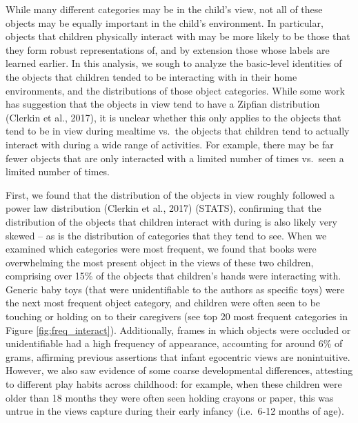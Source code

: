 \documentclass[10pt, letterpaper]{article}
\begin{document}
While many different categories may be in the child's view, not all of
these objects may be equally important in the child's environment. In
particular, objects that children physically interact with may be more
likely to be those that they form robust representations of, and by
extension those whose labels are learned earlier. In this analysis, we
sough to analyze the basic-level identities of the objects that children
tended to be interacting with in their home environments, and the
distributions of those object categories. While some work has suggestion
that the objects in view tend to have a Zipfian distribution (Clerkin et
al., 2017), it is unclear whether this only applies to the objects that
tend to be in view during mealtime vs.~the objects that children tend to
actually interact with during a wide range of activities. For example,
there may be far fewer objects that are only interacted with a limited
number of times vs.~seen a limited number of times.

First, we found that the distribution of the objects in view roughly
followed a power law distribution (Clerkin et al., 2017) (STATS),
confirming that the distribution of the objects that children interact
with during is also likely very skewed -- as is the distribution of
categories that they tend to see. When we examined which categories were
most frequent, we found that books were overwhelming the most present
object in the views of these two children, comprising over 15\% of the
objects that children's hands were interacting with. Generic baby toys
(that were unidentifiable to the authors as specific toys) were the next
most frequent object category, and children were often seen to be
touching or holding on to their caregivers (see top 20 most frequent
categories in Figure \ref{fig:freq_interact}). Additionally, frames in
which objects were occluded or unidentifiable had a high frequency of
appearance, accounting for around 6\% of grams, affirming previous
assertions that infant egocentric views are nonintuitive. However, we
also saw evidence of some coarse developmental differences, attesting to
different play habits across childhood: for example, when these children
were older than 18 months they were often seen holding crayons or paper,
this was untrue in the views capture during their early infancy
(i.e.~6-12 months of age).
\end{document}

